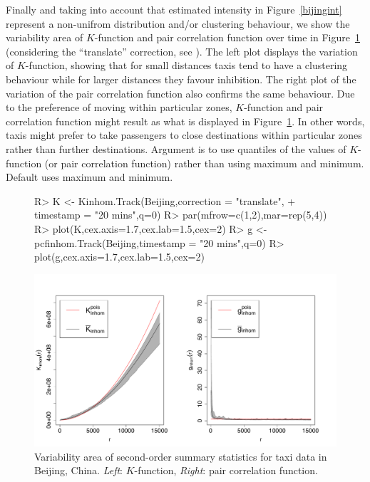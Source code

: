 \documentclass[article]{jss}
\begin{document}
  
  Finally and taking into account that estimated intensity in Figure~\ref{bijingint} represent a non-unifrom distribution and/or clustering behaviour, we show the variability area of $K$-function and pair correlation function over time in Figure~\ref{Kgvariation} (considering the ``translate'' correction, see \cite{gabriel2014}). The left plot displays the variation of $K$-function, showing that for small distances taxis tend to have a clustering behaviour while for larger distances they favour inhibition. The right plot of the variation of the pair correlation function also confirms the same behaviour. Due to the preference of moving within particular zones, $K$-function and pair correlation function might result as what is displayed in Figure~\ref{Kgvariation}. In other words, taxis might prefer to take passengers to close destinations within particular zones rather than further destinations. Argument  is to use quantiles of the values of $K$-function (or pair correlation function) rather than using maximum and minimum. Default  uses maximum and minimum.
\begin{figure}[!h]
\begin{center}
\begin{Sinput}
R>   K <- Kinhom.Track(Beijing,correction = "translate",
+                         timestamp = "20 mins",q=0)
R>   par(mfrow=c(1,2),mar=rep(5,4))
R>   plot(K,cex.axis=1.7,cex.lab=1.5,cex=2)
R>   g <- pcfinhom.Track(Beijing,timestamp = "20 mins",q=0)
R>   plot(g,cex.axis=1.7,cex.lab=1.5,cex=2)
\end{Sinput}
\includegraphics{article-021}
\end{center}
\caption{Variability area of second-order summary statistics for taxi data in Beijing, China. \emph{Left}: $K$-function, \emph{Right}: pair correlation function.}
\label{Kgvariation}
\end{figure}
  
\end{document}
